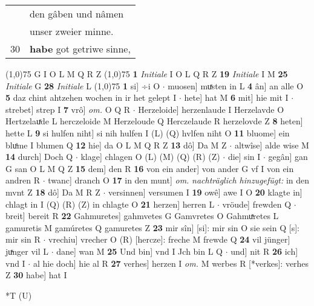 \documentclass[8pt,a4paper,notitlepage]{article}
\begin{document}
\begin{table}[ht]
\begin{minipage}[t]{0.5\linewidth}
\begin{tabular}{rl}
 & den gâben und nâmen\\ 
 & unser zweier minne.\\ 
30 & \textbf{habe} got getriwe sinne,\\ 
\end{tabular}
\scriptsize
\line(1,0){75} \newline
G I O L M Q R Z \newline
\line(1,0){75} \newline
\textbf{1} \textit{Initiale} I O L Q R Z  \textbf{19} \textit{Initiale} I M  \textbf{25} \textit{Initiale} G  \textbf{28} \textit{Initiale} L  \newline
\line(1,0){75} \newline
\textbf{1} si] ÷i O  $\cdot$ muosen] muͯsten in L \textbf{4} ân] an alle O \textbf{5} daz chint ahtzehen wochen in ir het gelept I  $\cdot$ hete] hat M \textbf{6} mit] hie mit I  $\cdot$ strebet] strep I \textbf{7} vrô] \textit{om.} O Q R  $\cdot$ Herzeloide] herzenlaude I Herzelavde O Hertzelauͯde L herczeloide M Herzeloude Q Herczelaude R herzelovde Z \textbf{8} heten] hette L \textbf{9} si hulfen niht] si nih hulfen I (L) (Q) hvlfen niht O \textbf{11} bluome] ein bluͤme I blumen Q \textbf{12} hie] da O L M Q R Z \textbf{13} dô] Da M Z  $\cdot$ altwîse] alde wise M \textbf{14} durch] Doch Q  $\cdot$ klage] chlagen O (L) (M) (Q) (R) (Z)  $\cdot$ die] sin I  $\cdot$ gegân] gan G san O L M Q Z \textbf{15} dem] den R \textbf{16} von ein ander] von ander G vf I von ein andren R  $\cdot$ twanc] dranch O \textbf{17} in den munt] \textit{om.} \textit{nachträglich hinzugefügt:} in den mvnt Z \textbf{18} dô] Da M R Z  $\cdot$ versinnen] versumen I \textbf{19} owê] awe I O \textbf{20} klagte in] chlagt in I (Q) (R) (Z) in chlagte O \textbf{21} herzen] herren L  $\cdot$ vröude] frewden Q  $\cdot$ breit] bereit R \textbf{22} Gahmuretes] gahmvetes G Gamvretes O Gahmuͯretes L gamuretis M gamúretes Q gamuretes Z \textbf{23} mir sîn] [si]: mir sin O sie sein Q [s]: mir sin R  $\cdot$ vrechiu] vrecher O (R) [hercze]: freche  M frewde Q \textbf{24} vil jünger] juͯnger vil L  $\cdot$ dane] wan M \textbf{25} Und bin] vnd I Jch bin L Q  $\cdot$ und] nit R \textbf{26} ich] vnd I  $\cdot$ al hie doch] hie al R \textbf{27} verhes] herzen I \textit{om.} M werbes R [*verkes]: verhes Z \textbf{30} habe] hat I \newline
\end{minipage}
\hspace{0.5cm}
\begin{minipage}[t]{0.5\linewidth}
\small
\begin{center}*T (U)

\end{center}
\end{minipage}
\end{table}
\end{document}
